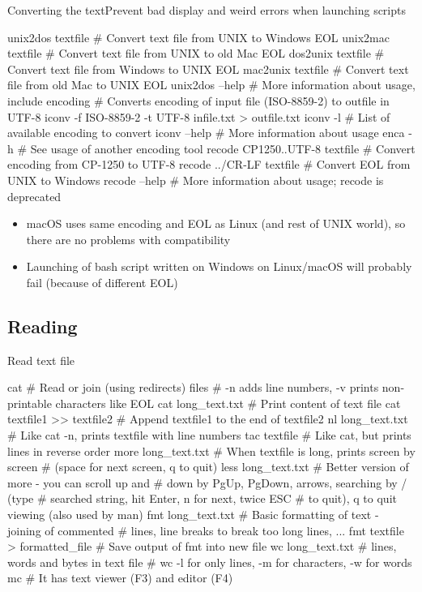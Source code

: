 \documentclass[compress, ucs, xelatex, 11pt, xcolor=svgnames, aspectratio=169,
	hyperref={
		bookmarks=true,
		unicode=true,
		colorlinks=true,
		pdftitle={Linux, command line and MetaCentrum},
		plainpages=false,
		pdfauthor={Vojtech Zeisek},
		pdfsubject={Course about use of Linux command line, writing shell scripts and using MetaCentrum of CESNET},
		pdfcreator={XeLaTeX},
		pdfkeywords={Linux, GNU, BASH, shell, command line, MetaCentrum},
		linkcolor=DarkRed, %
		anchorcolor=DarkBlue, %
		citecolor=Indigo, %
		filecolor=NavyBlue, %
		menucolor=DarkMagenta, %
		urlcolor=DarkBlue, %
		pdftex},
	url={hyphens, lowtilde} %
	]{beamer}
\begin{document}
\begin{frame}[fragile]{Converting the text}{Prevent bad display and weird errors when launching scripts}
	\begin{bashcode}
    unix2dos textfile # Convert text file from UNIX to Windows EOL
    unix2mac textfile # Convert text file from UNIX to old Mac EOL
    dos2unix textfile # Convert text file from Windows to UNIX EOL
    mac2unix textfile # Convert text file from old Mac to UNIX EOL
    unix2dos --help # More information about usage, include encoding
    # Converts encoding of input file (ISO-8859-2) to outfile in UTF-8
    iconv -f ISO-8859-2 -t UTF-8 infile.txt > outfile.txt
    iconv -l # List of available encoding to convert
    iconv --help # More information about usage
    enca -h # See usage of another encoding tool
    recode CP1250..UTF-8 textfile # Convert encoding from CP-1250 to UTF-8
    recode ../CR-LF textfile # Convert EOL from UNIX to Windows
    recode --help # More information about usage; recode is deprecated
	\end{bashcode}
	\begin{itemize}
		\item macOS uses same encoding and EOL as Linux (and rest of UNIX world), so there are no problems with compatibility
		\item Launching of bash script written on Windows on Linux/macOS will probably fail (because of different EOL)
	\end{itemize}
\end{frame}

\subsection{Reading}

\begin{frame}[fragile]{Read text file}
	\begin{bashcode}
    cat # Read or join (using redirects) files
        # -n adds line numbers, -v prints non-printable characters like EOL
    cat long_text.txt # Print content of text file
    cat textfile1 >> textfile2 # Append textfile1 to the end of textfile2
    nl long_text.txt # Like cat -n, prints textfile with line numbers
    tac textfile # Like cat, but prints lines in reverse order
    more long_text.txt # When textfile is long, prints screen by screen
                       # (space for next screen, q to quit)
    less long_text.txt # Better version of more - you can scroll up and
                       # down by PgUp, PgDown, arrows, searching by / (type
                       # searched string, hit Enter, n for next, twice ESC
                       # to quit), q to quit viewing (also used by man)
    fmt long_text.txt # Basic formatting of text - joining of commented
                      # lines, line breaks to break too long lines, ...
    fmt textfile > formatted_file # Save output of fmt into new file
    wc long_text.txt # lines, words and bytes in text file
                     # wc -l for only lines, -m for characters, -w for words
    mc # It has text viewer (F3) and editor (F4)
	\end{bashcode}
\end{frame}
\end{document}

